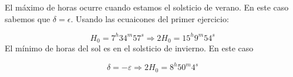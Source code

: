		
	El máximo de horas ocurre cuando estamos el solsticio de verano. En este caso sabemos que $\delta=\epsilon$. Usando las ecuaicones del primer ejercicio:
		
	 \begin{equation}
	 	H_0 = 7^h 34^m 57^s \Rightarrow 2H_0 = 15^h 9^m 54^s
	 \end{equation}
	 El mínimo de horas del sol es en el solsticio de invierno.  En este caso
		
	 \begin{equation}
	 	\delta = - \varepsilon \Rightarrow 2H_0 = 8^h 50^m 4^s
	 \end{equation}
